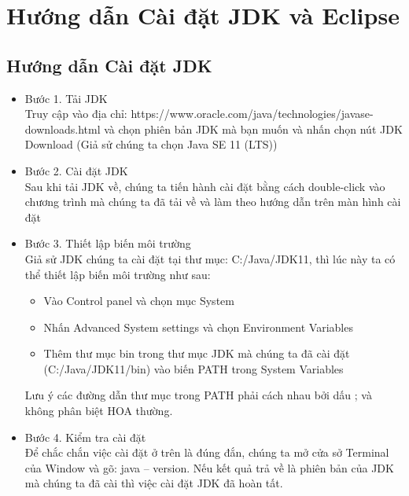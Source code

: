 \section{Hướng dẫn Cài đặt JDK và Eclipse}
\subsection{Hướng dẫn Cài đặt JDK}
\begin{itemize}
\item Bước 1. Tải JDK\\
Truy cập vào địa chỉ: https://www.oracle.com/java/technologies/javase-downloads.html và chọn phiên bản JDK mà bạn muốn và nhấn chọn nút JDK Download (Giả sử chúng ta chọn Java SE 11 (LTS))
\item Bước 2. Cài đặt JDK\\
Sau khi tải JDK về, chúng ta tiến hành cài đặt bằng cách double-click vào chương trình mà chúng ta đã tải về và làm theo hướng dẫn trên màn hình cài đặt
\item Bước 3. Thiết lập biến môi trường\\
Giả sử JDK chúng ta cài đặt tại thư mục: C:/Java/JDK11, thì lúc này ta có thể thiết lập biến môi trường như sau:
\begin{itemize}
\item Vào Control panel và chọn mục System
\item Nhấn Advanced System settings và chọn Environment Variables
\item Thêm thư mục bin trong thư mục JDK mà chúng ta đã cài đặt (C:/Java/JDK11/bin) vào biến PATH trong System Variables
\end{itemize}
\indent Lưu ý các đường dẫn thư mục trong PATH phải cách nhau bởi dấu ; và không phân biệt HOA thường.
\item Bước 4. Kiểm tra cài đặt\\
Để chắc chắn việc cài đặt ở trên là đúng đắn, chúng ta mở cửa sở Terminal của Window và gõ: {\ttfamily java – version}. Nếu kết quả trả về là phiên bản của JDK mà chúng ta đã cài thì việc cài đặt JDK đã hoàn tất.
\end{itemize}
